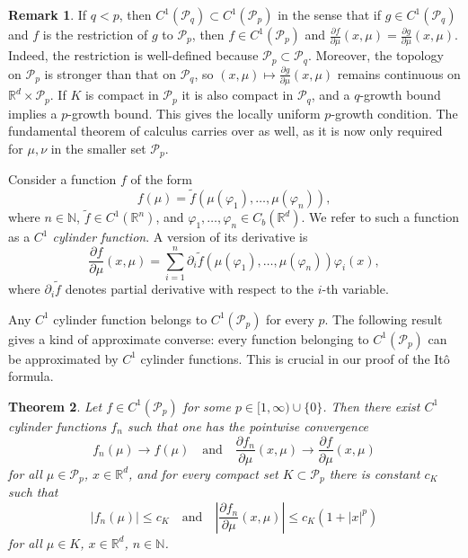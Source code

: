 \documentclass{article}
\newtheorem{theorem}{Theorem}[section]
\theoremstyle{definition}
\newtheorem{remark}[theorem]{\textbf{Remark}}
\numberwithin{equation}{section}
\numberwithin{theorem}{section}
\newcommand{\R}{\mathbb{R}}
\newcommand{\N}{{\mathbb N}}
\newcommand{\Pcal}{{\mathcal P}}
\begin{document}
\begin{remark} \label{R_C1Pq_in_C1Pp}
If $q < p$, then $C^1(\Pcal_q) \subset C^1(\Pcal_p)$ in the sense that if $g \in C^1(\Pcal_q)$ and $f$ is the restriction of $g$ to $\Pcal_p$, then $f \in C^1(\Pcal_p)$ and $\frac{\partial f}{\partial\mu}(x,\mu)=\frac{\partial g}{\partial\mu}(x,\mu)$. Indeed, the restriction is well-defined because $\Pcal_p \subset \Pcal_q$. Moreover, the topology on $\Pcal_p$ is stronger than that on $\Pcal_q$, so $(x,\mu)\mapsto\frac{\partial g}{\partial\mu}(x,\mu)$ remains continuous on ${\R^d}\times\Pcal_p$. If $K$ is compact in $\Pcal_p$ it is also compact in $\Pcal_q$, and a $q$-growth bound implies a $p$-growth bound. This gives the locally uniform $p$-growth condition. The fundamental theorem of calculus carries over as well, as it is now only required for $\mu,\nu$ in the smaller set $\Pcal_p$.
\end{remark}



Consider a function $f$ of the form
\begin{equation}\label{eq_C1_cylinder}
f(\mu)=\tilde f(\mu(\varphi_1),\ldots,\mu(\varphi_n)),
\end{equation}
where $n\in\N$, $\tilde f\in C^1(\R^n)$, and $\varphi_1,\ldots,\varphi_n\in C_b({\R^d})$. We refer to such a function as a \emph{$C^1$ cylinder function}. A version of its derivative is
\begin{equation}\label{eq_C1r_der_cyl_ex}
\frac{\partial f}{\partial\mu}(x,\mu) = \sum_{i=1}^n \partial_i\tilde f(\mu(\varphi_1),\ldots,\mu(\varphi_n)) \varphi_i(x),
\end{equation}
where $\partial_i\tilde f$ denotes partial derivative with respect to the $i$-th variable.

Any $C^1$ cylinder function belongs to $C^1(\Pcal_p)$ for every $p$. The following result gives a kind of approximate converse: every function belonging to $C^1(\Pcal_p)$ can be approximated by $C^1$ cylinder functions. This is crucial in our proof of the It\^o formula.




\begin{theorem}\label{T_approx_cyl}
Let $f \in C^1(\Pcal_p)$ for some $p \in [1,\infty) \cup \{0\}$. Then there exist $C^1$ cylinder functions $f_n$ such that one has the pointwise convergence
\begin{equation}\label{T_approx_cyl_1}
f_n(\mu) \to f(\mu) \quad\text{and}\quad \frac{\partial f_n}{\partial\mu}(x,\mu) \to \frac{\partial f}{\partial\mu}(x,\mu)
\end{equation}
for all $\mu \in \Pcal_p$, $x \in {\R^d}$, and for every compact set $K\subset\Pcal_p$ there is constant $c_K$ such that
\begin{equation}\label{T_approx_cyl_2}
|f_n(\mu)| \le c_K \quad\text{and}\quad \left|  \frac{\partial f_n}{\partial\mu}(x,\mu) \right| \le c_K (1 + |x|^p)
\end{equation}
for all $\mu\in K$, $x \in {\R^d}$, $n\in\N$.
\end{theorem}
\end{document}
